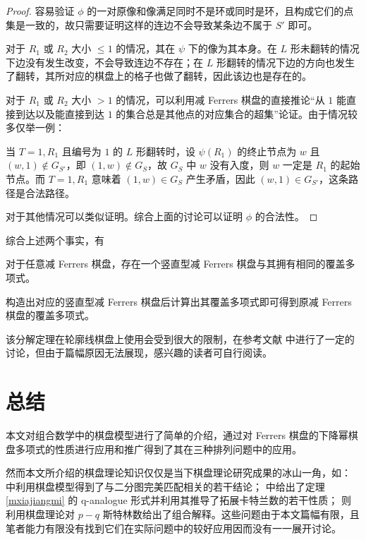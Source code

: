 \documentclass{noithesis}
\begin{document}
\begin{proof}
		容易验证 $\phi$ 的一对原像和像满足同时不是环或同时是环，且构成它们的点集是一致的，故只需要证明这样的连边不会导致某条边不属于 $S'$ 即可。
		
		对于 $R_1$ 或 $R_2$ 大小 $\leq 1$ 的情况，其在 $\psi$ 下的像为其本身。在 $L$ 形未翻转的情况下边没有发生改变，不会导致连边不存在；在 $L$ 形翻转的情况下边的方向也发生了翻转，其所对应的棋盘上的格子也做了翻转，因此该边也是存在的。
		
		对于 $R_1$ 或 $R_2$ 大小 $>1$ 的情况，可以利用减 Ferrers 棋盘的直接推论“从 $1$ 能直接到达以及能直接到达 $1$ 的集合总是其他点的对应集合的超集”论证。由于情况较多仅举一例：
		
		当 $T = 1,R_1$ 且编号为 $1$ 的 $L$ 形翻转时，设 $\psi(R_1)$ 的终止节点为 $w$ 且 $(w,1) \not\in G_{S'}$，即 $(1,w) \not\in G_S$，故 $G_S$ 中 $w$ 没有入度，则 $w$ 一定是 $R_1$ 的起始节点。而 $T = 1,R_1$ 意味着 $(1,w) \in G_S$ 产生矛盾，因此 $(w,1) \in G_{S'}$，这条路径是合法路径。
		
		对于其他情况可以类似证明。综合上面的讨论可以证明 $\phi$ 的合法性。
	\end{proof}

	综合上述两个事实，有
	\begin{theorem} \label{decrease=upright}
		对于任意减 Ferrers 棋盘，存在一个竖直型减 Ferrers 棋盘与其拥有相同的覆盖多项式。
	\end{theorem}

	构造出对应的竖直型减 Ferrers 棋盘后计算出其覆盖多项式即可得到原减 Ferrers 棋盘的覆盖多项式。
	
	该分解定理在轮廓线棋盘上使用会受到很大的限制，在参考文献 \cite{1997Factorization} 中进行了一定的讨论，但由于篇幅原因无法展现，感兴趣的读者可自行阅读。
	
	\section{总结}
	
	本文对组合数学中的棋盘模型进行了简单的介绍，通过对 Ferrers 棋盘的下降幂棋盘多项式的性质进行应用和推广得到了其在三种排列问题中的应用。
	
	然而本文所介绍的棋盘理论知识仅仅是当下棋盘理论研究成果的冰山一角，如：\cite{2001Rook} 中利用棋盘模型得到了与二分图完美匹配相关的若干结论；\cite{2014m} 中给出了定理 \ref{mxiajiangmi} 的 q-analogue 形式并利用其推导了拓展卡特兰数的若干性质；\cite{2004Rook} 则利用棋盘理论对 $p-q$ 斯特林数给出了组合解释。这些问题由于本文篇幅有限，且笔者能力有限没有找到它们在实际问题中的较好应用因而没有一一展开讨论。
	
\end{document}
